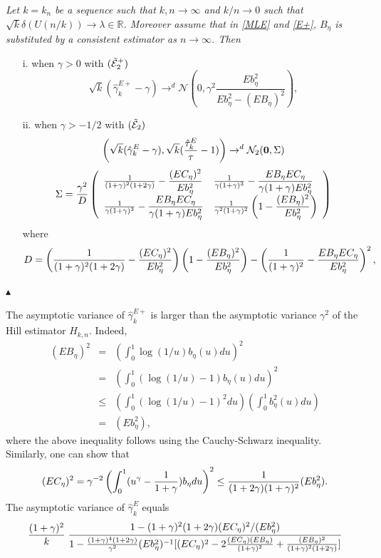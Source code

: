 \begin{theorem}\label{theorem1} {\it Let $k=k_n$ be a sequence such that $k,n \to \infty$ and $k/n \to 0$ such that $\sqrt{k}\delta (U(n/k)) \to \lambda \in \mathbb{R}$. Moreover assume that in \eqref{MLE}
and \eqref{E+}, $B_{\eta}$ is substituted by a consistent estimator as $n\to \infty$. Then
\begin{enumerate}
\item[i.] when $\gamma>0$ with $({\tilde{\cal{E}}}_2^+)$ 
$$\sqrt{k}\left( \hat{\gamma}_k^{E+} -\gamma \right) \to^d \mathcal{N}\left(0,\gamma^2 \dfrac{Eb^2_{\eta}}{Eb^2_{\eta}-(EB_{\eta})^2}\right),$$
\item[ii.] when $\gamma > -1/2$ with $({\tilde{\cal{E}}}_2)$ 
$$\left( \sqrt{k}( \hat{\gamma}_k^{E} -\gamma), \sqrt{k} ({\hat{\tau}^{E}_k\over \tau}-1) \right)\to^d \mathcal{N}_2({\bf 0},\Sigma)$$
\[
\Sigma ={\gamma^2 \over D}
\left( 
\begin{array}{ll}
{1 \over (1+\gamma)^2(1+2\gamma)} - \dfrac{ (EC_{\eta})^2}{Eb^2_{\eta}} 
 & 
{1 \over \gamma(1+\gamma)^3 }-\dfrac{EB_{\eta}EC_{\eta}}{\gamma(1+\gamma)Eb^2_{\eta}}
\\
{1 \over \gamma(1+\gamma)^3 }-\dfrac{EB_{\eta}EC_{\eta}}{\gamma(1+\gamma)Eb^2_{\eta}}
&
{1 \over \gamma^2(1+\gamma)^2}\left(1- \dfrac{(EB_{\eta})^2}{Eb^2_{\eta}} \right)
\end{array}
\right)
\]
where
\[
D=\left( {1 \over (1+\gamma)^2(1+2\gamma)} - \dfrac{ (EC_{\eta})^2}{Eb^2_{\eta}} \right)\left(1- \dfrac{(EB_{\eta})^2}{Eb^2_{\eta}}\right)
- \left( {1 \over (1+\gamma)^2 }- \dfrac{EB_{\eta}EC_{\eta}}{Eb^2_{\eta}}\right)^2,
\]
\end{enumerate} 
} $\blacktriangle$
\end{theorem}
\vspace{0.3cm}\noindent
\begin{remark} The asymptotic variance of $\hat{\gamma}_k^{E+}$ is larger than the asymptotic variance $\gamma^2$ of the Hill estimator $H_{k,n}$. Indeed, 
\begin{eqnarray*}
(EB_\eta)^2 &=& \left( \int_0^1 \log (1/u) b_{\eta}(u) du \right)^2 \\
&=& \left( \int_0^1 (\log (1/u) -1) b_{\eta}(u) du \right)^2 \\
&\leq & \left( \int_0^1 (\log (1/u) -1)^2 du \right)
\left( \int_0^1 b^2_{\eta}(u) du \right)\\
&=& (Eb^2_\eta),
\end{eqnarray*}
where the above inequality follows using the Cauchy-Schwarz inequality. \\
Similarly, one can show that
\[
(EC_\eta)^2= \gamma^{-2} \left(\int_0^1 (u^\gamma -{1 \over 1+\gamma})b_\eta du \right)^2 \leq {1 \over (1+2\gamma)(1+\gamma)^2}
(Eb^2_\eta).
\]
The asymptotic variance of $\hat{\gamma}_k^{E}$ equals 
\[
{(1+\gamma)^2 \over k} \;
\dfrac{1- (1+\gamma)^2(1+2\gamma)(EC_\eta)^2/(Eb_\eta^2)}
{1- {(1+\gamma)^4(1+2\gamma)\over \gamma^2} (Eb_\eta^2)^{-1}
[(EC_\eta)^2 -2 {(EC_\eta)(EB_\eta)\over (1+\gamma)^2}+ {(EB_\eta)^2 \over (1+\gamma)^{2}(1+2\gamma)}]
}
\]
\end{remark}
